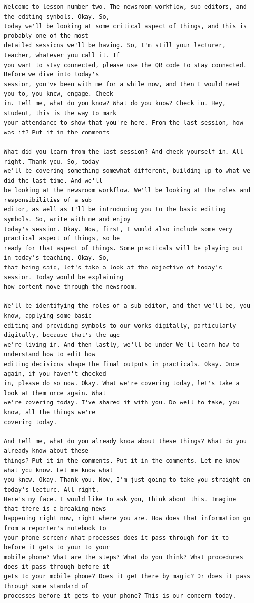 {\small
\begin{Verbatim}
Welcome to lesson number two. The newsroom workflow, sub editors, and the editing symbols. Okay. So,
today we'll be looking at some critical aspect of things, and this is probably one of the most
detailed sessions we'll be having. So, I'm still your lecturer, teacher, whatever you call it. If
you want to stay connected, please use the QR code to stay connected. Before we dive into today's
session, you've been with me for a while now, and then I would need you to, you know, engage. Check
in. Tell me, what do you know? What do you know? Check in. Hey, student, this is the way to mark
your attendance to show that you're here. From the last session, how was it? Put it in the comments.

What did you learn from the last session? And check yourself in. All right. Thank you. So, today
we'll be covering something somewhat different, building up to what we did the last time. And we'll
be looking at the newsroom workflow. We'll be looking at the roles and responsibilities of a sub
editor, as well as I'll be introducing you to the basic editing symbols. So, write with me and enjoy
today's session. Okay. Now, first, I would also include some very practical aspect of things, so be
ready for that aspect of things. Some practicals will be playing out in today's teaching. Okay. So,
that being said, let's take a look at the objective of today's session. Today would be explaining
how content move through the newsroom.

We'll be identifying the roles of a sub editor, and then we'll be, you know, applying some basic
editing and providing symbols to our works digitally, particularly digitally, because that's the age
we're living in. And then lastly, we'll be under We'll learn how to understand how to edit how
editing decisions shape the final outputs in practicals. Okay. Once again, if you haven't checked
in, please do so now. Okay. What we're covering today, let's take a look at them once again. What
we're covering today. I've shared it with you. Do well to take, you know, all the things we're
covering today.

And tell me, what do you already know about these things? What do you already know about these
things? Put it in the comments. Put it in the comments. Let me know what you know. Let me know what
you know. Okay. Thank you. Now, I'm just going to take you straight on today's lecture. All right.
Here's my face. I would like to ask you, think about this. Imagine that there is a breaking news
happening right now, right where you are. How does that information go from a reporter's notebook to
your phone screen? What processes does it pass through for it to before it gets to your to your
mobile phone? What are the steps? What do you think? What procedures does it pass through before it
gets to your mobile phone? Does it get there by magic? Or does it pass through some standard of
processes before it gets to your phone? This is our concern today.


\end{Verbatim}}
